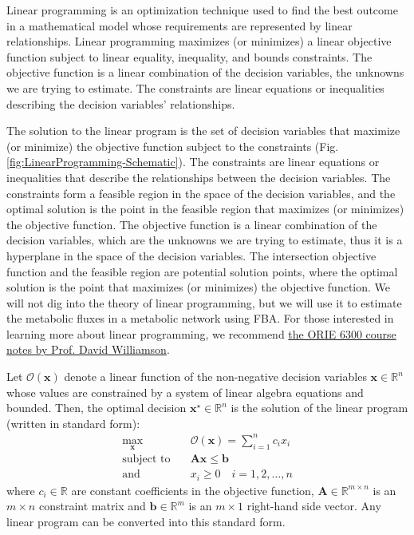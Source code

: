 \documentclass{article}[11pt]
\begin{document}
Linear programming is an optimization technique used to find the best outcome in a mathematical model whose requirements are represented by linear relationships.
Linear programming maximizes (or minimizes) a linear objective function subject to linear equality, inequality, and bounds constraints.
The objective function is a linear combination of the decision variables, the unknowns we are trying to estimate.
The constraints are linear equations or inequalities describing the decision variables' relationships.

The solution to the linear program is the set of decision variables that maximize (or minimize) the objective function subject to the constraints (Fig. \ref{fig:LinearProgramming-Schematic}).
The constraints are linear equations or inequalities that describe the relationships between the decision variables.
The constraints form a feasible region in the space of the decision variables, and the optimal solution is the point in the feasible region that maximizes (or minimizes) the objective function.
The objective function is a linear combination of the decision variables, which are the unknowns we are trying to estimate, thus it is a hyperplane in the space of the decision variables.
The intersection objective function and the feasible region are potential solution points, where the optimal solution is the point that maximizes (or minimizes) the objective function.
We will not dig into the theory of linear programming, but we will use it to estimate the metabolic fluxes in a metabolic network using FBA.
For those interested in learning more about linear programming, we recommend \href{https://people.orie.cornell.edu/dpw/orie6300/}{the ORIE 6300 course notes by Prof. David Williamson}.

Let $\mathcal{O}(\mathbf{x})$ denote a linear function of the non-negative decision variables $\mathbf{x}\in\mathbb{R}^{n}$
whose values are constrained by a system of linear algebra equations and bounded. 
Then, the optimal decision $\mathbf{x}^{\star}\in\mathbb{R}^{n}$ is the solution of the linear program (written in standard form):
\begin{align*}
\max_{\mathbf{x}} &\quad \mathcal{O}(\mathbf{x}) = \sum_{i=1}^{n} c_{i}{x}_{i}\\
\text{subject to}&\quad\mathbf{A}\mathbf{x} \leq\mathbf{b}\\
\text{and} &\quad x_{i}\geq{0}\quad{i=1,2,\dots,n}
\end{align*}
where $c_{i}\in\mathbb{R}$ are constant coefficients in the objective function, $\mathbf{A}\in\mathbb{R}^{m\times{n}}$ 
is an $m\times{n}$ constraint matrix and $\mathbf{b}\in\mathbb{R}^{m}$ is an $m\times{1}$ right-hand side vector. 
Any linear program can be converted into this standard form.  
\end{document}
